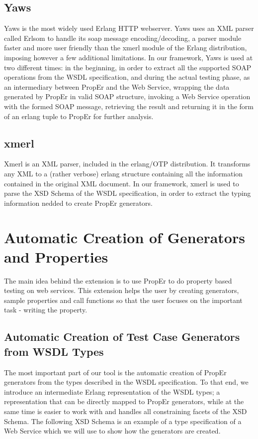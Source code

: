\documentclass[submission,copyright,a4]{eptcs}
\begin{document}
\subsection{Yaws}

Yaws is the most widely used Erlang HTTP webserver. Yaws uses an XML parser called Erlsom to handle its soap message encoding/decoding, a parser module faster and more user friendly than the xmerl module of the Erlang distribution, imposing however a few additional limitations. In our framework, Yaws is used at two different times: in the beginning, in order to extract all the supported SOAP operations from the WSDL specification, and during the actual testing phase, as an intermediary between PropEr and the Web Service, wrapping the data generated by PropEr in valid SOAP structure, invoking a Web Service operation with the formed SOAP message, retrieving the result and returning it in the form of an erlang tuple to PropEr for further analysis.

\subsection{xmerl}

Xmerl is an XML parser, included in the erlang/OTP distribution. It transforms any XML to a (rather verbose) erlang structure containing all the information contained in the original XML document. In our framework, xmerl is used to parse the XSD Schema of the WSDL specification, in order to extract the typing information nedded to create PropEr generators.

\section{Automatic Creation of Generators and Properties}

The main idea behind the extension is to use PropEr to do property based testing on web services. This extension helps the user by creating generators, sample properties and call functions so that the user focuses on the important task - writing the property. 

\subsection{Automatic Creation of Test Case Generators from WSDL Types}

The most important part of our tool is the automatic creation of PropEr generators from the types described in the WSDL specification. To that end, we introduce an intermediate Erlang representation of the WSDL types; a representation that can be directly mapped to PropEr generators, while at the same time is easier to work with and handles all constraining facets of the XSD Schema. The following XSD Schema is an example of a type specification of a Web Service which we will use to show how the generators are created.
\end{document}
